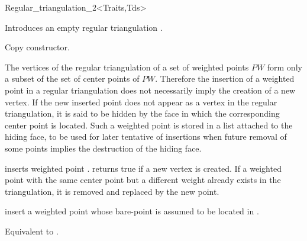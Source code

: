 \begin{ccRefClass}{Regular_triangulation_2<Traits,Tds>}

\ccInheritsFrom
{}

\ccTypes
{}
\ccThreeToTwo
{}

\ccGlue
{}
\ccGlue
{}
\ccGlue
{}
\ccGlue
{}


\ccCreation
{}  %

{Introduces an empty regular triangulation \ccVar.}

{Copy constructor.}



The vertices of the regular triangulation
of a set of weighted points ${  PW}$ form only a subset
of the set of center points of ${   PW}$.
Therefore the  insertion of a weighted point  in a regular triangulation
does not necessarily imply the creation of a new vertex.
If the new inserted point does not appear as a vertex in the
regular triangulation, it is said to be hidden 
by the face in which the corresponding center point is located.
Such a weighted point is stored in a list attached to the hiding face,
to be used for later tentative of insertions when future removal
of some points implies the destruction of the hiding face.



{inserts  weighted point .
returns true if a new vertex is created. 
If a weighted point with the same center point but a 
different weight already exists in the triangulation, 
it is removed and replaced by the new point.
}

{insert a weighted point  whose bare-point is assumed to be
located in  .}

{Equivalent to .}


\end{ccRefClass}
